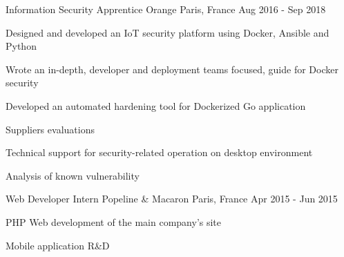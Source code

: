 

\begin{cventries}

  \cventry
    {Information Security Apprentice } %
    {Orange} %
    {Paris, France} %
    {Aug 2016 - Sep 2018} %
    {
      \begin{cvitems} %
        \item {Designed and developed an IoT security platform using Docker, Ansible and Python}
        \item {Wrote an in-depth, developer and deployment teams focused, guide for Docker security}
        \item {Developed an automated hardening tool for Dockerized Go application}
        \item {Suppliers evaluations}
        \item {Technical support for security-related operation on desktop environment}
        \item {Analysis of known vulnerability}
      \end{cvitems}
    }
  \cventry
    {Web Developer Intern} %
    {Popeline \& Macaron} %
    {Paris, France} %
    {Apr 2015 - Jun 2015} %
    {
      \begin{cvitems} %
        \item {PHP Web development of the main company's site}
        \item {Mobile application R\&D}
      \end{cvitems}
    }
\end{cventries}
